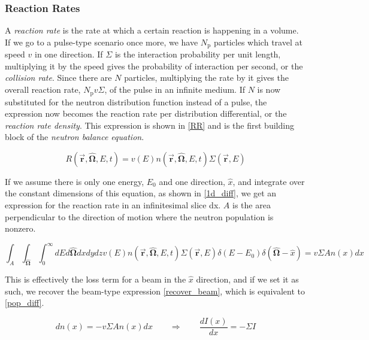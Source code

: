 \subsubsection{Reaction Rates}

A \emph{reaction rate} is the rate at which a certain reaction is happening in a volume.  If we go to a pulse-type scenario once more, we have $N_\mathrm{p}$ particles which travel at speed $v$ in one direction.  If $\Sigma$ is the interaction probability per unit length, multiplying it by the speed gives the probability of interaction per second, or the \emph{collision rate}.  Since there are $N$ particles, multiplying the rate by it gives the overall reaction rate, $N_\mathrm{p} v \Sigma$, of the pulse in an infinite medium.  If $N$ is now substituted for the neutron distribution function instead of a pulse, the expression now becomes the reaction rate per distribution differential, or the \emph{reaction rate density}.  This expression is shown in \eqref{RR} and is the first building block of the \emph{neutron balance equation}.

\begin{equation}
\label{RR}
R(\boldsymbol{\vec{r}},\boldsymbol{\hat{\Omega}},E,t)  = v(E) n(\boldsymbol{\vec{r}},\boldsymbol{\hat{\Omega}},E,t) \Sigma(\boldsymbol{\vec{r}},E)
\end{equation}

If we assume there is only one energy, $E_0$ and one direction, $\hat{x}$, and integrate over the constant dimensions of this equation, as shown in \eqref{1d_diff}, we get an expression for the reaction rate in an infinitesimal slice dx.  $A$ is the area perpendicular to the direction of motion where the neutron population is nonzero.


\begin{equation}
\label{1d_diff}
\int_A \int_{\boldsymbol{\hat{\Omega}}} \int_0^{\infty}  dE d\boldsymbol{\hat{\Omega}} dxdydz  v(E) n(\boldsymbol{\vec{r}},\boldsymbol{\hat{\Omega}},E,t) \Sigma(\boldsymbol{\vec{r}},E) \delta(E-E_0) \delta(\boldsymbol{\hat{\Omega}}-\hat{x})  = v \Sigma A n(x)dx 
\end{equation}

This is effectively the loss term for a beam in the $\hat{x}$ direction, and if we set it as such, we recover the beam-type expression \eqref{recover_beam}, which is equivalent to \eqref{pop_diff}.  

\begin{equation}
\label{recover_beam}
dn(x) = - v \Sigma A n(x)dx  \qquad \Rightarrow \qquad  \frac{dI(x)}{dx}= - \Sigma I
\end{equation}


